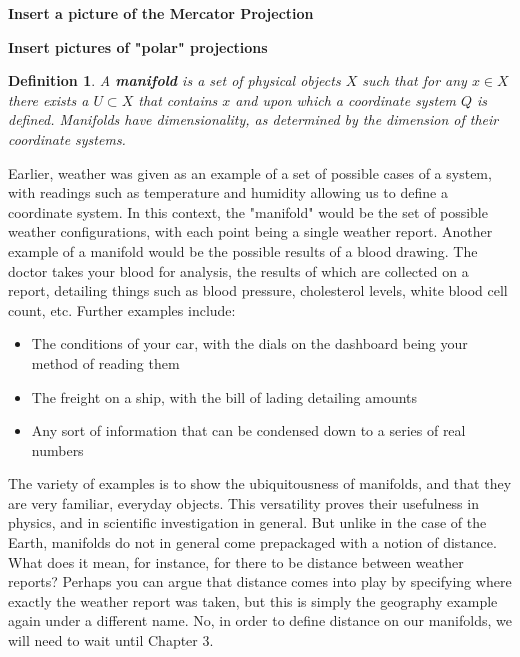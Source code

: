\documentclass{book}
\newtheorem{defn}[equation]{Definition}
\begin{document}
\textbf{Insert a picture of the Mercator Projection}

\textbf{Insert pictures of "polar" projections}

\begin{defn}
	A \textbf{manifold} is a set of physical objects $X$ such that for any $x \in X$ there exists a $U \subset X$ that contains $x$ and upon which a coordinate system $Q$ is defined. Manifolds have dimensionality, as determined by the dimension of their coordinate systems.
\end{defn}


Earlier, weather was given as an example of a set of possible cases of a system, with readings such as temperature and humidity allowing us to define a coordinate system. In this context, the "manifold" would be the set of possible weather configurations, with each point being a single weather report. Another example of a manifold would be the possible results of a blood drawing. The doctor takes your blood for analysis, the results of which are collected on a report, detailing things such as blood pressure, cholesterol levels, white blood cell count, etc. Further examples include: 

\begin{itemize}
\item The conditions of your car, with the dials on the dashboard being your method of reading them 

\item The freight on a ship, with the bill of lading detailing amounts

\item Any sort of information that can be condensed down to a series of real numbers

\end{itemize}

The variety of examples is to show the ubiquitousness of manifolds, and that they are very familiar, everyday objects. This versatility proves their usefulness in physics, and in scientific investigation in general. But unlike in the case of the Earth, manifolds do not in general come prepackaged with a notion of distance. What does it mean, for instance, for there to be distance between weather reports? Perhaps you can argue that distance comes into play by specifying where exactly the weather report was taken, but this is simply the geography example again under a different name. No, in order to define distance on our manifolds, we will need to wait until Chapter 3. 
\end{document}
